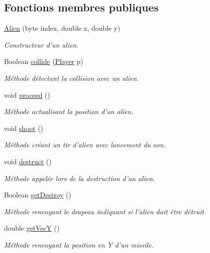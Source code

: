 \subsection*{Fonctions membres publiques}
\begin{DoxyCompactItemize}
\item 
\hyperlink{class_alien_a330e393dc37d83b31ff5b0cc7bcd33c8}{Alien} (byte index, double x, double y)
\begin{DoxyCompactList}\small\item\em Constructeur d'un alien. \end{DoxyCompactList}\item 
Boolean \hyperlink{class_alien_ad09b7f992dd6c43fa713e54ce5e00c6a}{collide} (\hyperlink{class_player}{Player} p)
\begin{DoxyCompactList}\small\item\em Méthode détectant la collision avec un alien. \end{DoxyCompactList}\item 
void \hyperlink{class_alien_afd48e2f5c93af1286f24a6caacd84919}{proceed} ()
\begin{DoxyCompactList}\small\item\em Méthode actualisant la position d'un alien. \end{DoxyCompactList}\item 
void \hyperlink{class_alien_a20b62f53c3fb13b489da812ab0bd5941}{shoot} ()
\begin{DoxyCompactList}\small\item\em Méthode créant un tir d'alien avec lancement du son. \end{DoxyCompactList}\item 
void \hyperlink{class_alien_a1d6a17c91905b3e3003edd07fd9210dc}{destruct} ()
\begin{DoxyCompactList}\small\item\em Méthode appelée lors de la destruction d'un alien. \end{DoxyCompactList}\item 
Boolean \hyperlink{class_alien_a7fd4cc9ee380d3bc3a31a9b39600d777}{get\-Destroy} ()
\begin{DoxyCompactList}\small\item\em Méthode renvoyant le drapeau indiquant si l'alien doit être détruit. \end{DoxyCompactList}\item 
double \hyperlink{class_alien_a006b25db50a54b9cbea4d901ffdd8f82}{get\-Vec\-Y} ()
\begin{DoxyCompactList}\small\item\em Méthode renvoyant la position en Y d'un missile. \end{DoxyCompactList}\end{DoxyCompactItemize}
